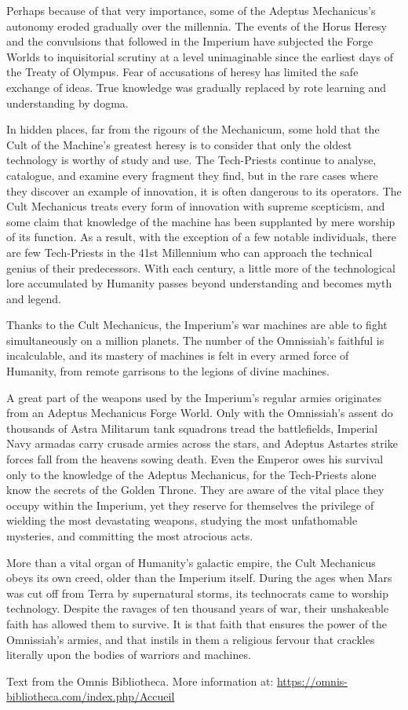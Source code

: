 Perhaps because of that very importance, some of the Adeptus Mechanicus's autonomy eroded gradually over the millennia. The events of the Horus Heresy and the convulsions that followed in the Imperium have subjected the Forge Worlds to inquisitorial scrutiny at a level unimaginable since the earliest days of the Treaty of Olympus. Fear of accusations of heresy has limited the safe exchange of ideas. True knowledge was gradually replaced by rote learning and understanding by dogma.

In hidden places, far from the rigours of the Mechanicum, some hold that the Cult of the Machine's greatest heresy is to consider that only the oldest technology is worthy of study and use. The Tech-Priests continue to analyse, catalogue, and examine every fragment they find, but in the rare cases where they discover an example of innovation, it is often dangerous to its operators. The Cult Mechanicus treats every form of innovation with supreme scepticism, and some claim that knowledge of the machine has been supplanted by mere worship of its function. As a result, with the exception of a few notable individuals, there are few Tech-Priests in the 41st Millennium who can approach the technical genius of their predecessors. With each century, a little more of the technological lore accumulated by Humanity passes beyond understanding and becomes myth and legend.

Thanks to the Cult Mechanicus, the Imperium's war machines are able to fight simultaneously on a million planets. The number of the Omnissiah's faithful is incalculable, and its mastery of machines is felt in every armed force of Humanity, from remote garrisons to the legions of divine machines.

A great part of the weapons used by the Imperium's regular armies originates from an Adeptus Mechanicus Forge World. Only with the Omnissiah's assent do thousands of Astra Militarum tank squadrons tread the battlefields, Imperial Navy armadas carry crusade armies across the stars, and Adeptus Astartes strike forces fall from the heavens sowing death. Even the Emperor owes his survival only to the knowledge of the Adeptus Mechanicus, for the Tech-Priests alone know the secrets of the Golden Throne. They are aware of the vital place they occupy within the Imperium, yet they reserve for themselves the privilege of wielding the most devastating weapons, studying the most unfathomable mysteries, and committing the most atrocious acts.

More than a vital organ of Humanity's galactic empire, the Cult Mechanicus obeys its own creed, older than the Imperium itself. During the ages when Mars was cut off from Terra by supernatural storms, its technocrats came to worship technology. Despite the ravages of ten thousand years of war, their unshakeable faith has allowed them to survive. It is that faith that ensures the power of the Omnissiah's armies, and that instils in them a religious fervour that crackles literally upon the bodies of warriors and machines.

Text from the Omnis Bibliotheca. More information at: \url{https://omnis-bibliotheca.com/index.php/Accueil}
